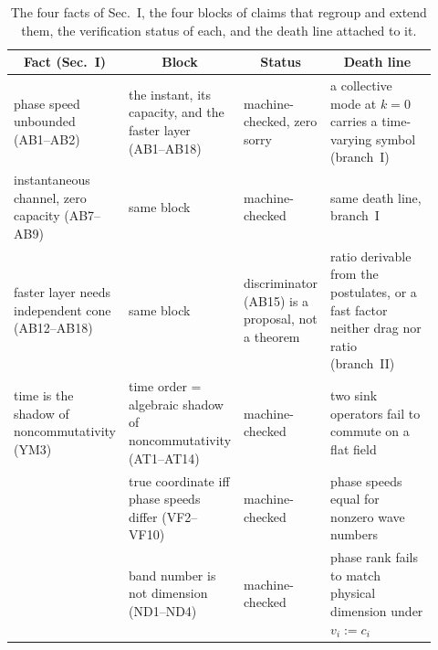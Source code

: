 \documentclass[aps,prd,preprint,superscriptaddress,amsmath,amssymb]{revtex4-2}
\begin{document}
\begin{table}[h]
\centering
\caption{The four facts of Sec.~I, the four blocks of claims that
regroup and extend them, the verification status of each, and the
death line attached to it.}
\begin{ruledtabular}
\begin{tabular}{@{}p{0.19\linewidth}p{0.27\linewidth}p{0.15\linewidth}p{0.31\linewidth}@{}}
\multicolumn{1}{c}{Fact (Sec.~I)} & \multicolumn{1}{c}{Block} &
\multicolumn{1}{c}{Status} & \multicolumn{1}{c}{Death line}\\
\hline
phase speed unbounded (AB1--AB2) & the instant, its capacity, and
the faster layer (AB1--AB18) & machine-checked, zero sorry &
a collective mode at $k=0$ carries a time-varying symbol
(branch~I)\\
instantaneous channel, zero capacity (AB7--AB9) & same block &
machine-checked & same death line, branch~I\\
faster layer needs independent cone (AB12--AB18) & same block &
discriminator (AB15) is a proposal, not a theorem &
ratio derivable from the postulates, or a fast factor neither drag
nor ratio (branch~II)\\
time is the shadow of noncommutativity (YM3) & time order = algebraic
shadow of noncommutativity (AT1--AT14) & machine-checked &
two sink operators fail to commute on a flat field\\
& true coordinate iff phase speeds differ (VF2--VF10) & machine-checked &
phase speeds equal for nonzero wave numbers\\
& band number is not dimension (ND1--ND4) & machine-checked &
phase rank fails to match physical dimension under $v_i:=c_i$\\
\end{tabular}
\end{ruledtabular}
\end{table}
\end{document}
